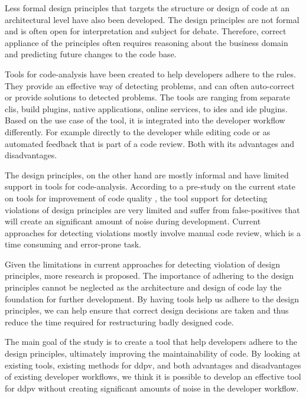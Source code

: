 \documentclass{report}
\begin{document}
Less formal design principles that targets the structure or design of code at an architectural level have also been developed. The design principles are not formal and is often open for interpretation and subject for debate. Therefore, correct appliance of the principles often requires reasoning about the business domain and predicting future changes to the code base. 

Tools for code-analysis have been created to help developers adhere to the rules. They provide an effective way of detecting problems, and can often auto-correct or provide solutions to detected problems. The tools are ranging from separate \gls{cli}s, build plugins, native applications, online services, to \gls{ide}s and \gls{ide} plugins. Based on the use case of the tool, it is integrated into the developer workflow differently. For example directly to the developer while editing code or as automated feedback that is part of a code review. Both with its advantages and disadvantages.

The design principles, on the other hand are mostly informal and have limited support in tools for code-analysis. According to a pre-study on the current state on tools for improvement of code quality \cite{prestudy}, the tool support for detecting violations of design principles are very limited and suffer from false-positives that will create an significant amount of noise during development. Current approaches for detecting violations mostly involve manual code review, which is a time consuming and error-prone task.

Given the limitations in current approaches for detecting violation of design principles, more research is proposed. The importance of adhering to the design principles cannot be neglected as the architecture and design of code lay the foundation for further development. By having tools help us adhere to the design principles, we can help ensure that correct design decisions are taken and thus reduce the time required for restructuring badly designed code.  

The main goal of the study is to create a tool that help developers adhere to the design principles, ultimately improving the maintainability of code. By looking at existing tools, existing methods for \gls{ddpv}, and both advantages and disadvantages of existing developer workflows, we think it is possible to develop an effective tool for \gls{ddpv} without creating significant amounts of noise in the developer workflow.
\end{document}
